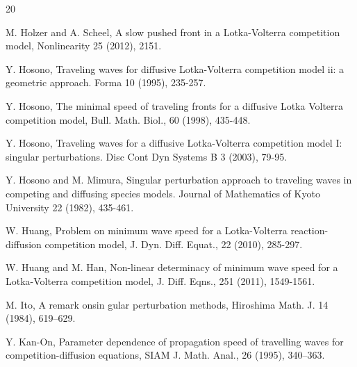 \documentclass[11pt,a4paper]{article}
\numberwithin{equation}{section}
\numberwithin{figure}{section}
\begin{document}
\begin{thebibliography}{20}



{M. Holzer and A. Scheel}, A slow pushed front in a Lotka-Volterra competition model, Nonlinearity
25 (2012), 2151.

{Y. Hosono}, Traveling waves for diffusive Lotka-Volterra competition model ii: a geometric approach.
Forma 10 (1995), 235-257.

{Y. Hosono}, The minimal speed of traveling fronts for a diffusive Lotka Volterra competition
model, Bull. Math. Biol., 60 (1998), 435-448.

{Y. Hosono}, Traveling waves for a diffusive Lotka-Volterra competition model I: singular perturbations.
Disc Cont Dyn Systems B 3 (2003), 79-95.

{Y. Hosono and M. Mimura}, Singular perturbation approach to traveling waves in competing and diffusing species models. Journal of Mathematics of Kyoto University 22 (1982), 435-461.

{W. Huang}, Problem on minimum wave speed for a Lotka-Volterra reaction-diffusion competition model,
J. Dyn. Diff. Equat., 22 (2010), 285-297.

{W. Huang and M. Han}, Non-linear determinacy of minimum wave speed for a Lotka-Volterra competition
model, J. Diff. Eqns., 251 (2011), 1549-1561.

{M. Ito}, A remark onsin gular perturbation methods, Hiroshima Math. J. 14 (1984), 619–629.

{Y. Kan-On},
Parameter dependence of propagation speed of travelling waves for competition-diffusion equations,
SIAM J. Math. Anal., 26 (1995), 340--363.




\end{thebibliography}
\end{document}
